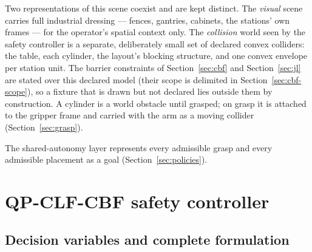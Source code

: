 \documentclass[12pt,a4paper,twoside,openright]{report}
\begin{document}
Two representations of this scene coexist and are kept distinct. The \emph{visual} scene carries full industrial dressing --- fences, gantries, cabinets, the stations' own frames --- for the operator's spatial context only. The \emph{collision} world seen by the safety controller is a separate, deliberately small set of declared convex colliders: the table, each cylinder, the layout's blocking structure, and one convex envelope per station unit. The barrier constraints of Section~\ref{sec:cbf} and Section~\ref{sec:jl} are stated over this declared model (their scope is delimited in Section~\ref{sec:cbf-scope}), so a fixture that is drawn but not declared lies outside them by construction. A cylinder is a world obstacle until grasped; on grasp it is attached to the gripper frame and carried with the arm as a moving collider (Section~\ref{sec:grasp}).

The shared-autonomy layer represents every admissible grasp and every admissible placement as a goal (Section~\ref{sec:policies}).

\section{QP-CLF-CBF safety controller}
\label{sec:qp}

\subsection{Decision variables and complete formulation}
\end{document}
